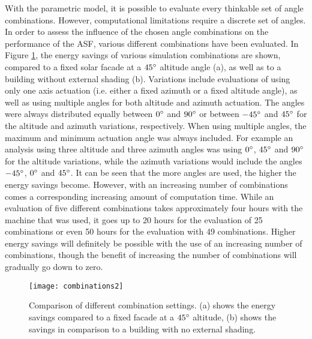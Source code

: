 	With the parametric model, it is possible to evaluate every thinkable set of angle combinations. However, computational limitations require a discrete set of angles. In order to assess the influence of the chosen angle combinations on the performance of the ASF, various different combinations have been evaluated. In Figure \ref{fig:combinations}, the energy savings of various simulation combinations are shown, compared to a fixed solar facade at a $45\degree$ altitude angle (a), as well as to a building without external shading (b). Variations include evaluations of using only one axis actuation (i.e. either a fixed azimuth or a fixed altitude angle), as well as using multiple angles for both altitude and azimuth actuation. The angles were always distributed equally between $0\degree$ and $90\degree$ or between $-45\degree$ and $45\degree$ for the altitude and azimuth variations, respectively. When using multiple angles, the maximum and minimum actuation angle was always included. For example an analysis using three altitude and three azimuth angles was using $0\degree$, $45\degree$ and $90\degree$ for the altitude variations, while the azimuth variations would include the angles $-45\degree$, $0\degree$ and $45\degree$. It can be seen that the more angles are used, the higher the energy savings become. However, with an increasing number of combinations comes a corresponding increasing amount of computation time. While an evaluation of five different combinations takes approximately four hours with the machine that was used, it goes up to 20 hours for the evaluation of 25 combinations or even 50 hours for the evaluation with 49 combinations. Higher energy savings will definitely be possible with the use of an increasing number of combinations, though the benefit of increasing the number of combinations will gradually go down to zero. 
	\begin{figure*}
		\begin{center}
		\texttt{[image: combinations2]}
		\caption{Comparison of different combination settings. (a) shows the energy savings compared to a fixed facade at a $45\degree$ altitude, (b) shows the savings in comparison to a building with no external shading.}
		\label{fig:combinations}
		\end{center}
	\end{figure*}
	
